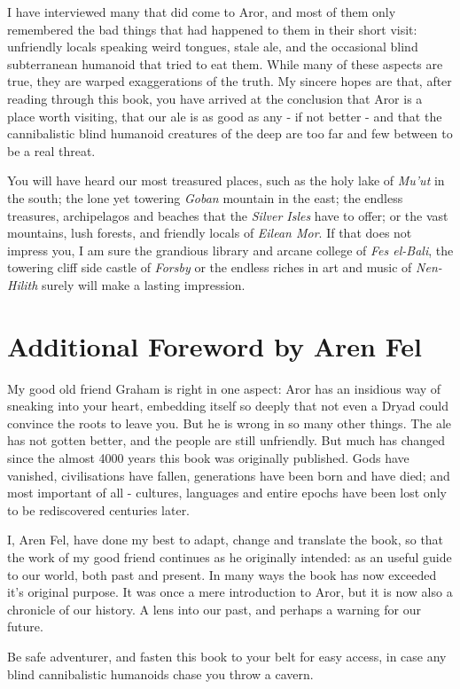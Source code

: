 I have interviewed many that did come to Aror, and most of them only
remembered the bad things that had happened to them in their short
visit: unfriendly locals speaking weird tongues, stale ale, and the
occasional blind subterranean humanoid that tried to eat them. While
many of these aspects are true, they are warped exaggerations of the
truth. My sincere hopes are that, after reading through this book, you
have arrived at the conclusion that Aror is a place worth visiting,
that our ale is as good as any - if not better - and that the
cannibalistic blind humanoid creatures of the deep are too far and few
between to be a real threat.

You will have heard our most treasured places, such as the holy lake
of \emph{Mu'ut} in the south; the lone yet towering \emph{Goban}
mountain in the east; the endless treasures, archipelagos and beaches
that the \emph{Silver Isles} have to offer; or the vast mountains,
lush forests, and friendly locals of \emph{Eilean Mor}. If that does
not impress you, I am sure the grandious library and arcane college of
\emph{Fes el-Bali}, the towering cliff side castle of \emph{Forsby} or
the endless riches in art and music of \emph{Nen-Hilith} surely will
make a lasting impression.

\section*{Additional Foreword by Aren Fel}

My good old friend Graham is right in one aspect: Aror has an insidious
way of sneaking into your heart, embedding itself so deeply that not
even a Dryad could convince the roots to leave you. But he is wrong in
so many other things. The ale has not gotten better, and the people
are still unfriendly. But much has changed since the almost 4000 years
this book was originally published. Gods have vanished, civilisations
have fallen, generations have been born and have died; and most important
of all - cultures, languages and entire epochs have been lost only to be
rediscovered centuries later.

I, Aren Fel, have done my best to adapt, change and translate the
book, so that the work of my good friend continues as he originally
intended: as an useful guide to our world, both past and present. In
many ways the book has now exceeded it's original purpose. It was once
a mere introduction to Aror, but it is now also a chronicle of our
history. A lens into our past, and perhaps a warning for our future.

Be safe adventurer, and fasten this book to your belt for easy access,
in case any blind cannibalistic humanoids chase you throw a cavern.
